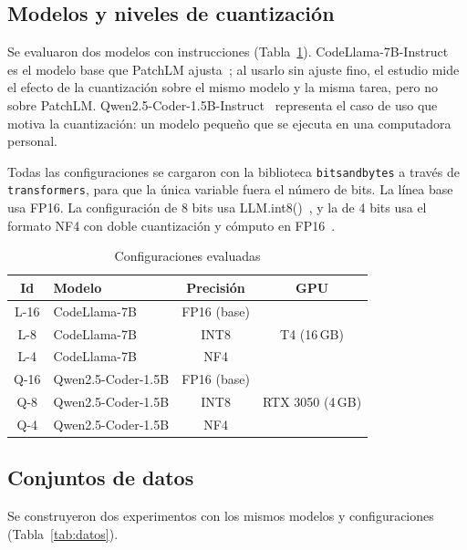 \documentclass[conference]{IEEEtran}
\begin{document}
\subsection{Modelos y niveles de cuantización}

Se evaluaron dos modelos con instrucciones (Tabla~\ref{tab:config}). CodeLlama-7B-Instruct~\cite{roziere2023codellama} es el modelo base que PatchLM ajusta~\cite{bhandari2025patchlm}; al usarlo sin ajuste fino, el estudio mide el efecto de la cuantización sobre el mismo modelo y la misma tarea, pero no sobre PatchLM. Qwen2.5-Coder-1.5B-Instruct~\cite{hui2024qwen25coder} representa el caso de uso que motiva la cuantización: un modelo pequeño que se ejecuta en una computadora personal.

Todas las configuraciones se cargaron con la biblioteca \texttt{bitsandbytes} a través de \texttt{transformers}, para que la única variable fuera el número de bits. La línea base usa FP16. La configuración de 8 bits usa LLM.int8()~\cite{dettmers2022llmint8}, y la de 4 bits usa el formato NF4 con doble cuantización y cómputo en FP16~\cite{dettmers2023qlora}.

\begin{table}[htbp]
\caption{Configuraciones evaluadas}
\begin{center}
\begin{tabular}{|c|l|c|c|}
\hline
\textbf{Id} & \textbf{Modelo} & \textbf{Precisión} & \textbf{GPU} \\
\hline
L-16 & CodeLlama-7B & FP16 (base) & \\
L-8  & CodeLlama-7B & INT8 & T4 (16\,GB) \\
L-4  & CodeLlama-7B & NF4 & \\
\hline
Q-16 & Qwen2.5-Coder-1.5B & FP16 (base) & \\
Q-8  & Qwen2.5-Coder-1.5B & INT8 & RTX 3050 (4\,GB) \\
Q-4  & Qwen2.5-Coder-1.5B & NF4 & \\
\hline
\end{tabular}
\label{tab:config}
\end{center}
\end{table}

\subsection{Conjuntos de datos}

Se construyeron dos experimentos con los mismos modelos y configuraciones (Tabla~\ref{tab:datos}).
\end{document}

